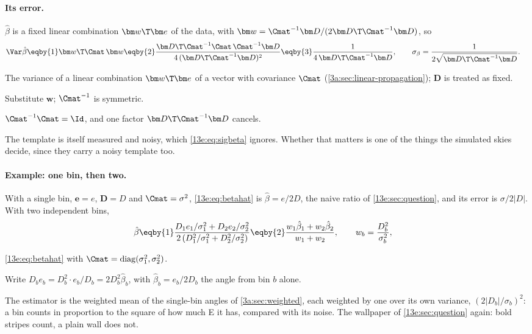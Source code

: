\paragraph{Its error.} $\hat\beta$ is a fixed linear combination $\bm w\T\bm e$ of the data, with
$\bm w=\Cmat^{-1}\bm D/(2\bm D\T\Cmat^{-1}\bm D)$, so
\begin{align}
  \Var\hat\beta
  &\eqby{1}\bm w\T\Cmat\,\bm w
   \eqby{2}\frac{\bm D\T\Cmat^{-1}\Cmat\,\Cmat^{-1}\bm D}{4\,(\bm D\T\Cmat^{-1}\bm D)^2}
   \eqby{3}\frac1{4\,\bm D\T\Cmat^{-1}\bm D},
  \qquad \sigma_\beta=\frac1{2\sqrt{\bm D\T\Cmat^{-1}\bm D}} .
  \label{13e:eq:sigbeta}
\end{align}
\begin{explain}
  \item The variance of a linear combination $\bm w\T\bm e$ of a vector with covariance $\Cmat$
        (\cref{3a:sec:linear-propagation}); $\bm D$ is treated as fixed.
  \item Substitute $\bm w$; $\Cmat^{-1}$ is symmetric.
  \item $\Cmat^{-1}\Cmat=\Id$, and one factor $\bm D\T\Cmat^{-1}\bm D$ cancels.
\end{explain}
The template is itself measured and noisy, which \eqref{13e:eq:sigbeta} ignores. Whether that matters is
one of the things the simulated skies decide, since they carry a noisy template too.

\paragraph{Example: one bin, then two.} With a single bin, $\bm e=e$, $\bm D=D$ and $\Cmat=\sigma^2$,
\eqref{13e:eq:betahat} is $\hat\beta=e/2D$, the naive ratio of \cref{13e:sec:question}, and its error is
$\sigma/2|D|$. With two independent bins,
\begin{align}
  \hat\beta
  &\eqby{1}\frac{D_1e_1/\sigma_1^2+D_2e_2/\sigma_2^2}{2\,(D_1^2/\sigma_1^2+D_2^2/\sigma_2^2)}
   \eqby{2}\frac{w_1\hat\beta_1+w_2\hat\beta_2}{w_1+w_2},\qquad w_b=\frac{D_b^2}{\sigma_b^2},
\end{align}
\begin{explain}
  \item \eqref{13e:eq:betahat} with $\Cmat={\rm diag}(\sigma_1^2,\sigma_2^2)$.
  \item Write $D_be_b=D_b^2\cdot e_b/D_b=2D_b^2\hat\beta_b$, with $\hat\beta_b=e_b/2D_b$ the angle from bin $b$ alone.
\end{explain}
The estimator is the weighted mean of the single-bin angles of \cref{3a:sec:weighted}, each weighted by
one over its own variance, $(2|D_b|/\sigma_b)^2$: a bin counts in proportion to the square of how much E it
has, compared with its noise. The wallpaper of \cref{13e:sec:question} again: bold stripes count, a plain
wall does not.

